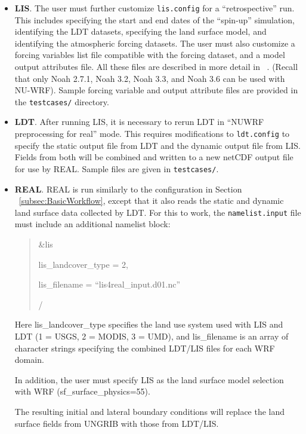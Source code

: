 \begin{itemize}
\begin{itemize}
  \end{itemize}

\item \textbf{LIS}. The user must further customize \texttt{lis.config} for 
  a ``retrospective'' run.  This includes specifying the start and end dates 
  of the ``spin-up'' simulation, identifying the LDT datasets, specifying the 
  land surface model, and identifying the atmospheric forcing datasets. The 
  user must also customize a forcing variables list file compatible with
  the forcing dataset, and a model output attributes file. All these files
  are described in more detail in ~\cite{ref:LisUserGuide}.  (Recall that
  only Noah 2.7.1, Noah 3.2, Noah 3.3, and Noah 3.6 can be used with NU-WRF).
  Sample forcing variable and output attribute files are provided in the
  \texttt{testcases/} directory.

\item \textbf{LDT}. After running LIS, it is necessary to rerun LDT in ``NUWRF
preprocessing for real'' mode. This requires modifications to 
\texttt{ldt.config} to specify the static output file from LDT and the dynamic
output file from LIS. Fields from both will be combined and written to a new
netCDF output file for use by REAL.  Sample files are given in 
\texttt{testcases/}.

\item \textbf{REAL}. REAL is run similarly to the configuration in Section
~\ref{subsec:BasicWorkflow}, except that it also reads the static and dynamic
land surface data collected by LDT. For this to work, the 
\texttt{namelist.input} file must include an additional namelist block:

\begin{quotation}
  \&lis

    lis\_landcover\_type = 2,

    lis\_filename = ``lis4real\_input.d01.nc''

  /
\end{quotation}

Here lis\_landcover\_type specifies the land use system used with LIS and LDT
(1 = USGS, 2 = MODIS, 3 = UMD), and lis\_filename is an array of character
strings specifying the combined LDT/LIS files for each WRF domain.

In addition, the user must specify LIS as the land surface model selection
with WRF (sf\_surface\_physics=55). 

The resulting initial and lateral boundary conditions will replace the 
land surface fields from UNGRIB with those from LDT/LIS. 


\end{itemize}
